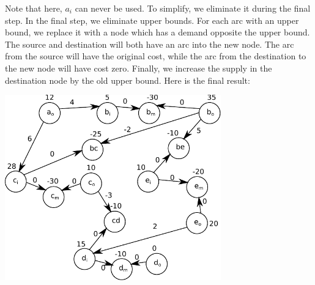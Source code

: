 \documentclass[fleqn]{homework}
\begin{document}
\begin{problem}{1}
\begin{enumerate}[a.]
      Note that here, $a_i$ can never be used.  To simplify, we eliminate it
      during the final step.  In the final step, we eliminate upper bounds.  For
      each arc with an upper bound, we replace it with a node which has a demand
      opposite the upper bound.  The source and destination will both have an
      arc into the new node.  The arc from the source will have the original
      cost, while the arc from the destination to the new node will have cost
      zero.  Finally, we increase the supply in the destination node by the old
      upper bound.  Here is the final result:

      \includegraphics[width=0.7\textwidth]{problem1-step3.pdf}
    \end{enumerate}

    
  \end{problem}
\end{document}
